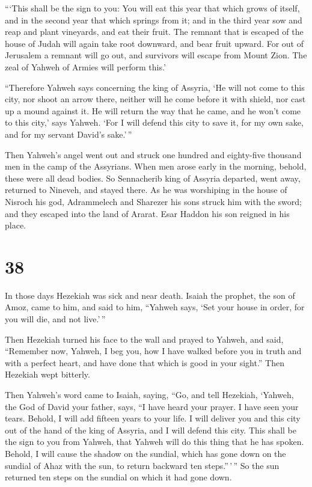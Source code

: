  ```This shall be the sign to you: You will eat this year
that which grows of itself, and in the second year that which springs
from it; and in the third year sow and reap and plant vineyards, and eat
their fruit.  The remnant that is escaped of the house of
Judah will again take root downward, and bear fruit upward.
 For out of Jerusalem a remnant will go out, and
survivors will escape from Mount Zion. The zeal of Yahweh of Armies will
perform this.'

 ``Therefore Yahweh says concerning the king of Assyria,
`He will not come to this city, nor shoot an arrow there, neither will
he come before it with shield, nor cast up a mound against it.
 He will return the way that he came, and he won't come
to this city,' says Yahweh.  `For I will defend this city
to save it, for my own sake, and for my servant David's sake.'\,''

 Then Yahweh's angel went out and struck one hundred and
eighty-five thousand men in the camp of the Assyrians. When men arose
early in the morning, behold, these were all dead bodies.
 So Sennacherib king of Assyria departed, went away,
returned to Nineveh, and stayed there.  As he was
worshiping in the house of Nisroch his god, Adrammelech and Sharezer his
sons struck him with the sword; and they escaped into the land of
Ararat. Esar Haddon his son reigned in his place.

\hypertarget{section-37}{%
\section{38}\label{section-37}}

 In those days Hezekiah was sick and near death. Isaiah
the prophet, the son of Amoz, came to him, and said to him, ``Yahweh
says, `Set your house in order, for you will die, and not live.'\,''

 Then Hezekiah turned his face to the wall and prayed to
Yahweh,  and said, ``Remember now, Yahweh, I beg you, how
I have walked before you in truth and with a perfect heart, and have
done that which is good in your sight.'' Then Hezekiah wept bitterly.

 Then Yahweh's word came to Isaiah, saying, 
``Go, and tell Hezekiah, `Yahweh, the God of David your father, says,
``I have heard your prayer. I have seen your tears. Behold, I will add
fifteen years to your life.  I will deliver you and this
city out of the hand of the king of Assyria, and I will defend this
city.  This shall be the sign to you from Yahweh, that
Yahweh will do this thing that he has spoken.  Behold, I
will cause the shadow on the sundial, which has gone down on the sundial
of Ahaz with the sun, to return backward ten steps.''\,'\,'' So the sun
returned ten steps on the sundial on which it had gone down.

